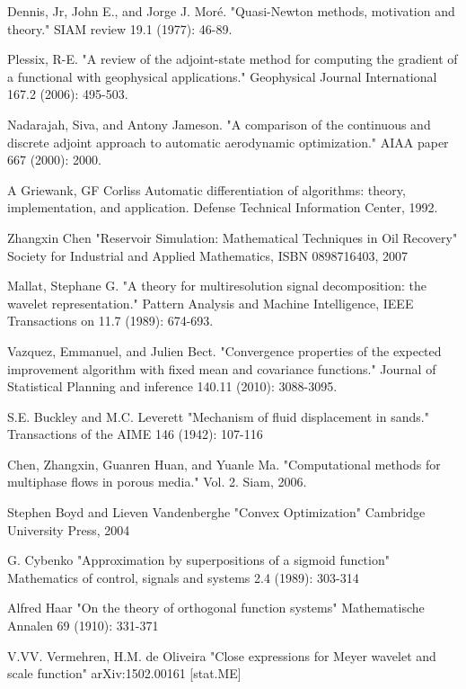\documentclass[a4paper,onecolumn]{article}
\theoremstyle{remark}
\begin{document}
\begin{thebibliography}{9}
Dennis, Jr, John E., and Jorge J. Moré. 
"Quasi-Newton methods, motivation and theory." 
SIAM review 19.1 (1977): 46-89.

Plessix, R-E. 
"A review of the adjoint-state method for computing the gradient of a functional with geophysical applications." 
Geophysical Journal International 167.2 (2006): 495-503.

Nadarajah, Siva, and Antony Jameson. 
"A comparison of the continuous and discrete adjoint approach to automatic aerodynamic optimization." 
AIAA paper 667 (2000): 2000.

A Griewank, GF Corliss
Automatic differentiation of algorithms: theory, implementation, and application.
Defense Technical Information Center, 1992.

Zhangxin Chen
"Reservoir Simulation: Mathematical Techniques in Oil Recovery"
Society for Industrial and Applied Mathematics, ISBN 0898716403, 2007

Mallat, Stephane G. 
"A theory for multiresolution signal decomposition: the wavelet representation." 
Pattern Analysis and Machine Intelligence, IEEE Transactions on 11.7 (1989): 674-693.

Vazquez, Emmanuel, and Julien Bect. 
"Convergence properties of the expected improvement algorithm with fixed mean and covariance functions." 
Journal of Statistical Planning and inference 140.11 (2010): 3088-3095.

S.E. Buckley and M.C. Leverett
"Mechanism of fluid displacement in sands."
Transactions of the AIME 146 (1942): 107-116

Chen, Zhangxin, Guanren Huan, and Yuanle Ma. 
"Computational methods for multiphase flows in porous media."
Vol. 2. Siam, 2006.

Stephen Boyd and Lieven Vandenberghe
"Convex Optimization"
Cambridge University Press, 2004

G. Cybenko
"Approximation by superpositions of a sigmoid function"
Mathematics of control, signals and systems 2.4 (1989): 303-314

Alfred Haar
"On the theory of orthogonal function systems"
Mathematische Annalen 69 (1910): 331-371

V.VV. Vermehren, H.M. de Oliveira
"Close expressions for Meyer wavelet and scale function"
arXiv:1502.00161 [stat.ME]


\end{thebibliography}
\end{document}
